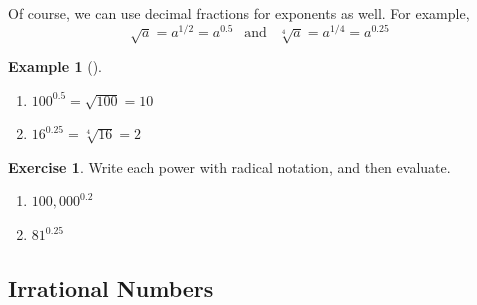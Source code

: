 \documentclass[10pt,]{book}
\theoremstyle{plain}
\theoremstyle{definition}
\theoremstyle{definition}
\theoremstyle{definition}
\newtheorem{example}[theorem]{Example}
\theoremstyle{definition}
\theoremstyle{definition}
\newtheorem{exercise}[theorem]{Exercise}
\numberwithin{equation}{section}
\begin{document}
    Of course, we can use decimal fractions for exponents as well. For example,
    \begin{equation*}\sqrt{a} = a^{1/2} = a^{0.5} ~~\text{ and } ~~ \sqrt[4]{a} = a^{1/4} = a^{0.25}\end{equation*}
%
\begin{example}[]\label{example-decimal-exponential-notation}
\leavevmode%
\begin{enumerate}[label=*\alph**]
\item\hypertarget{li-479}{}\(100^{0.5} = \sqrt{100} = 10\)\item\hypertarget{li-480}{}\(16^{0.25} = \sqrt[4]{16} = 2\)\end{enumerate}
\end{example}
\begin{exercise}\label{exercise-decimal-exponential-notation}
Write each power with radical notation, and then evaluate.
        \leavevmode%
\begin{enumerate}[label=*\alph**]
\item\hypertarget{li-481}{}\(100,000^{0.2}\)\item\hypertarget{li-482}{}\(81^{0.25}\)\end{enumerate}

\end{exercise}
\typeout{************************************************}
\typeout{************************************************}
\subsection[Irrational Numbers]{Irrational Numbers}\label{subsection-69}
\end{document}
